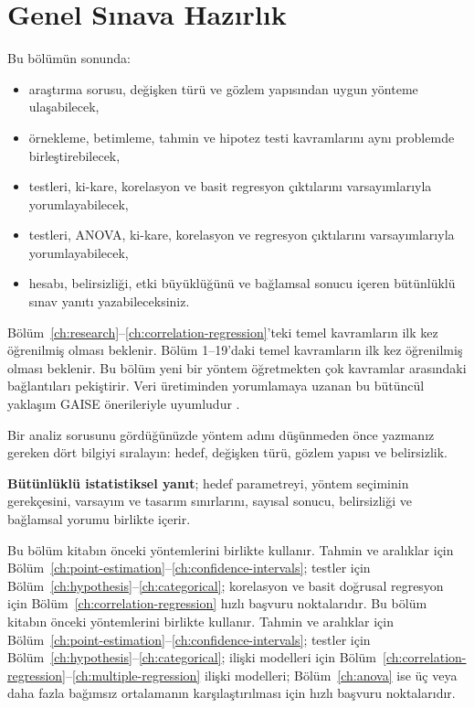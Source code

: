 \chapter{Genel Sınava Hazırlık}
\label{ch:review}

\begin{hedefler}
Bu bölümün sonunda:
\begin{itemize}
  \item araştırma sorusu, değişken türü ve gözlem yapısından uygun yönteme ulaşabilecek,
  \item örnekleme, betimleme, tahmin ve hipotez testi kavramlarını aynı problemde birleştirebilecek,
\ifimoders
  \item \tstat testleri, ki-kare, korelasyon ve basit regresyon çıktılarını varsayımlarıyla yorumlayabilecek,
\else
  \item \tstat testleri, ANOVA, ki-kare, korelasyon ve regresyon çıktılarını varsayımlarıyla yorumlayabilecek,
\fi
  \item hesabı, belirsizliği, etki büyüklüğünü ve bağlamsal sonucu içeren bütünlüklü sınav yanıtı yazabileceksiniz.
\end{itemize}
\end{hedefler}

\begin{prerequisitebox}
\ifimoders
Bölüm~\ref{ch:research}--\ref{ch:correlation-regression}'teki temel
kavramların ilk kez öğrenilmiş olması beklenir.
\else
Bölüm 1--19'daki temel kavramların ilk kez öğrenilmiş olması beklenir.
\fi
Bu
bölüm yeni bir yöntem öğretmekten çok kavramlar arasındaki bağlantıları
pekiştirir. Veri üretiminden yorumlamaya uzanan bu bütüncül yaklaşım GAISE
önerileriyle uyumludur \citep{gaise2016}.
\end{prerequisitebox}

\begin{hazirlik}
Bir analiz sorusunu gördüğünüzde yöntem adını düşünmeden önce yazmanız gereken
dört bilgiyi sıralayın: hedef, değişken türü, gözlem yapısı ve belirsizlik.
\end{hazirlik}

\begin{definitionbox}
\textbf{Bütünlüklü istatistiksel yanıt}; hedef parametreyi, yöntem seçiminin
gerekçesini, varsayım ve tasarım sınırlarını, sayısal sonucu, belirsizliği ve
bağlamsal yorumu birlikte içerir.
\end{definitionbox}

\ifimoders
Bu bölüm kitabın önceki yöntemlerini birlikte kullanır. Tahmin ve aralıklar
için Bölüm~\ref{ch:point-estimation}--\ref{ch:confidence-intervals}; testler
için Bölüm~\ref{ch:hypothesis}--\ref{ch:categorical}; korelasyon ve basit
doğrusal regresyon için Bölüm~\ref{ch:correlation-regression} hızlı başvuru
noktalarıdır.
\else
Bu bölüm kitabın önceki yöntemlerini birlikte kullanır. Tahmin ve aralıklar
için Bölüm~\ref{ch:point-estimation}--\ref{ch:confidence-intervals}; testler
için Bölüm~\ref{ch:hypothesis}--\ref{ch:categorical}; ilişki modelleri için
Bölüm~\ref{ch:correlation-regression}--\ref{ch:multiple-regression} ilişki
modelleri; Bölüm~\ref{ch:anova} ise üç veya daha fazla bağımsız ortalamanın
karşılaştırılması için hızlı başvuru noktalarıdır.
\fi

